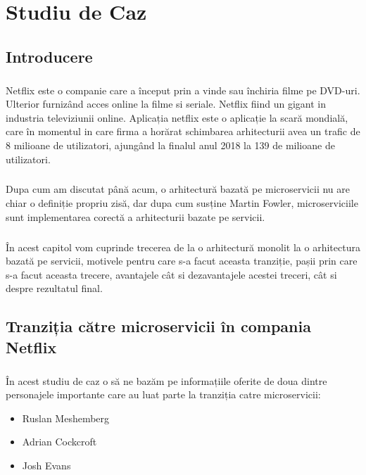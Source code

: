 \documentclass[12pt]{report}
\begin{document}
  \chapter{Studiu de Caz}
	\section{Introducere}
	\paragraph{}Netflix este o companie care a început prin a vinde sau închiria filme pe DVD-uri. Ulterior furnizând acces online la filme si seriale. Netflix fiind un gigant in industria televiziunii online. Aplicația netflix este o aplicație la scară mondială, care în momentul in care firma a horărat schimbarea arhitecturii avea un trafic de 8 milioane de utilizatori, ajungând la finalul anul 2018 la 139 de milioane de utilizatori.	
	\paragraph{}Dupa cum am discutat până acum, o arhitectură bazată pe microservicii nu are chiar o definiție propriu zisă, dar dupa cum susține Martin Fowler, microserviciile sunt implementarea corectă a arhitecturii bazate pe servicii. \cite{fowler1}
	\paragraph{}În acest capitol vom cuprinde trecerea de la o arhitectură monolit la o arhitectura bazată pe servicii, motivele pentru care s-a facut aceasta tranziție, pașii prin care s-a facut aceasta trecere, avantajele cât si dezavantajele acestei treceri, cât si despre rezultatul final.
	\section{Tranziția către microservicii în compania Netflix}
	\paragraph{}În acest studiu de caz o să ne bazăm pe informațiile oferite de doua dintre personajele importante care au luat parte la tranziția catre microservicii:
	\begin{itemize}
	\item Ruslan Meshemberg
	\item Adrian Cockcroft	
	\item Josh Evans	
	\end{itemize}
\end{document}
